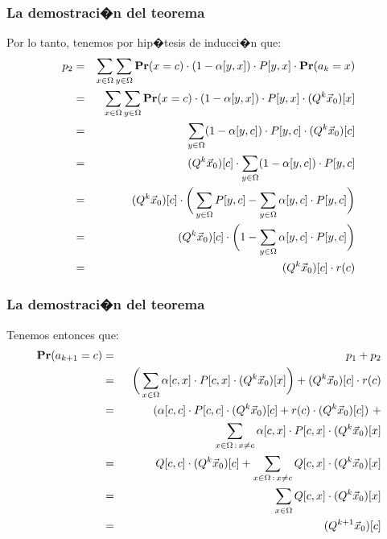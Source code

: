 \documentclass{beamer}
\newcommand{\pr}{{\rm {\bf Pr}}}
\begin{document}
	
	
	
	
	\begin{frame}
		\frametitle{La demostraci�n del teorema}
		
		{\footnotesize
			
			Por lo tanto, tenemos por hip�tesis de inducci�n que:
			\begin{eqnarray*}
				p_2
				&=& \sum_{x\in\Omega}\sum_{y\in\Omega} \pr(x=c) \cdot 
				(1-\alpha[y,x]) \cdot P[y,x] \cdot \pr(a_k=x) \\
				&=& \sum_{x\in\Omega}\sum_{y\in\Omega} \pr(x=c) \cdot
				(1-\alpha[y,x]) \cdot P[y,x] \cdot (Q^k \vec x_0)[x] \\
				&=& \sum_{y\in\Omega} 
				(1-\alpha[y,c])\cdot  P[y,c] \cdot (Q^k \vec x_0)[c] \\
				&=& (Q^k \vec x_0)[c] \cdot \sum_{y\in\Omega} 
				(1-\alpha[y,c]) \cdot P[y,c] \\
				&=& (Q^k \vec x_0)[c] \cdot \bigg(\sum_{y\in\Omega} P[y,c] - 
				\sum_{y\in\Omega}\alpha[y,c] \cdot P[y,c] \bigg) \\
				&=& (Q^k \vec x_0)[c] \cdot \bigg(1 - 
				\sum_{y\in\Omega}\alpha[y,c] \cdot P[y,c] \bigg) \\
				&=& (Q^k \vec x_0)[c] \cdot r(c)
			\end{eqnarray*}
			
		}
		
	\end{frame}
	
	
	
	
	
	\begin{frame}
		\frametitle{La demostraci�n del teorema}
		
		{\footnotesize
			
			Tenemos entonces que:
			\begin{eqnarray*}
				\pr(a_{k+1}=c)
				& = & p_1 + p_2 \\
				& = & \bigg(\sum_{x\in\Omega} \alpha[c,x] \cdot P[c,x] \cdot (Q^k \vec x_0)[x]\bigg) + (Q^k \vec x_0)[c] \cdot r(c) \\
				& = & (\alpha[c,c] \cdot P[c,c] \cdot (Q^k \vec x_0)[c] + r(c) \cdot (Q^k \vec x_0)[c]) \ + \\
				&&\hspace{80pt} \sum_{x\in\Omega \,:\, x \neq c} \alpha[c,x] \cdot P[c,x] \cdot (Q^k \vec x_0)[x] \\
				& = & Q[c,c] \cdot (Q^k \vec x_0)[c] + 
				\sum_{x\in\Omega \,:\, x \neq c} Q[c,x] \cdot (Q^k \vec x_0)[x] \\
				&= &\sum_{x\in\Omega} Q[c,x] \cdot (Q^k \vec x_0)[x] \\
				&= & (Q^{k+1} \vec x_0)[c]
			\end{eqnarray*}
			
		}
		
	\end{frame}
	
\end{document}
